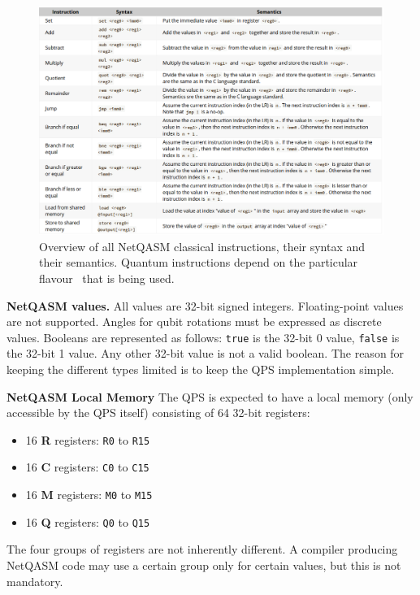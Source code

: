 \begin{figure}
    \centering
    \includegraphics[scale=0.4]{figures/qoala/netqasm_table.png}
    \caption{Overview of all NetQASM classical instructions, their syntax and their semantics.
    Quantum instructions depend on the particular flavour~\cite{dahlberg2022netqasm} that is being used.}
    \label{qoala:fig:app:netqasm_table}
\end{figure}


\textbf{NetQASM values.}
All values are 32-bit signed integers. Floating-point values are not supported. Angles for qubit rotations must be expressed as discrete values.
Booleans are represented as follows: \texttt{true} is the 32-bit 0 value, \texttt{false} is the 32-bit 1 value. Any other 32-bit value is not a valid boolean.
The reason for keeping the different types limited is to keep the QPS implementation simple.


\textbf{NetQASM Local Memory}
The QPS is expected to have a local memory (only accessible by the QPS itself) consisting of 64 32-bit registers:
\begin{itemize}
\item 16 \textbf{R} registers: \texttt{R0} to \texttt{R15}
\item 16 \textbf{C} registers: \texttt{C0} to \texttt{C15}
\item 16 \textbf{M} registers: \texttt{M0} to \texttt{M15}
\item 16 \textbf{Q} registers: \texttt{Q0} to \texttt{Q15}
\end{itemize}

The four groups of registers are not inherently different. A compiler producing NetQASM code may use a certain group only for certain values, but this is not mandatory.

